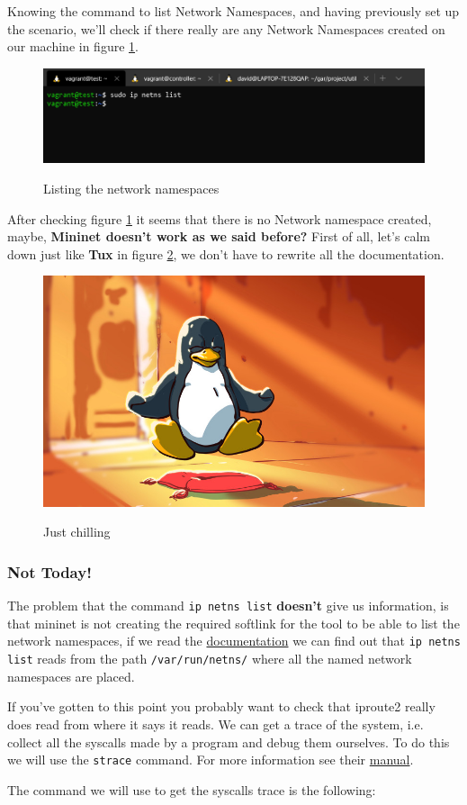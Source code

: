 \documentclass[12pt]{article}
\newcommand{\newpar} {
    \vskip 1cm
}
\begin{document}
		Knowing the command to list Network Namespaces, and having previously set up the scenario, we'll check if there really are any Network Namespaces created on our machine in figure \ref{f:netns_list}.

		\begin{figure}[!htb]
			\centering
			\includegraphics[width=\linewidth]{netns_list.png}
			\label{f:netns_list}
			\caption{Listing the network namespaces}
		\end{figure}

		After checking figure \ref{f:netns_list} it seems that there is no Network namespace created, maybe, \textbf{Mininet doesn't work as we said before?} First of all, let's calm down just like \textbf{Tux} in figure \ref{f:tux}, we don't have to rewrite all the documentation.

		\begin{figure}[!htb]
			\centering
			\includegraphics[width=0.6\linewidth]{calm_tux.jpg}
			\label{f:tux}
			\caption{Just chilling}
		\end{figure}

		\subsubsection{Not Today!}
			The problem that the command \texttt{ip netns list} \textbf{doesn't} give us information, is that mininet is not creating the required softlink for the tool to be able to list the network namespaces, if we read the \href{http://man7.org/linux/man-pages/man8/ip-netns.8.html}{documentation} we can find out that \texttt{ip netns list} reads from the path \texttt{/var/run/netns/} where all the named network namespaces are placed. 
			\newpar
			If you've gotten to this point you probably want to check that iproute2 really does read from where it says it reads. We can get a trace of the system, i.e. collect all the syscalls made by a program and debug them ourselves. To do this we will use the \texttt{strace} command. For more information see their \href{https://linux.die.net/man/1/strace}{manual}.
			\newpar
			The command we will use to get the syscalls trace is the following:
\end{document}
